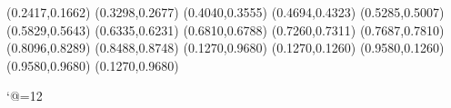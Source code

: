 \PST@Circle(0.2417,0.1662)
\PST@Circle(0.3298,0.2677)
\PST@Circle(0.4040,0.3555)
\PST@Circle(0.4694,0.4323)
\PST@Circle(0.5285,0.5007)
\PST@Circle(0.5829,0.5643)
\PST@Circle(0.6335,0.6231)
\PST@Circle(0.6810,0.6788)
\PST@Circle(0.7260,0.7311)
\PST@Circle(0.7687,0.7810)
\PST@Circle(0.8096,0.8289)
\PST@Circle(0.8488,0.8748)
\PST@Border(0.1270,0.9680)
(0.1270,0.1260)
(0.9580,0.1260)
(0.9580,0.9680)
(0.1270,0.9680)

\catcode`@=12
\fi
\endpspicture
